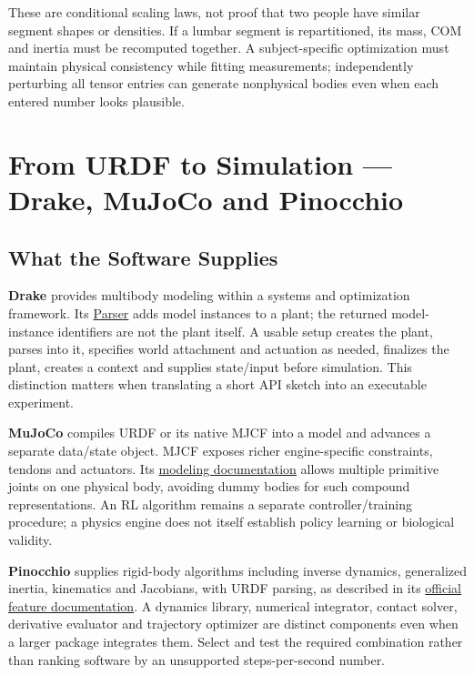 These are conditional scaling laws, not proof that two people have similar segment shapes or densities. If a lumbar segment is repartitioned, its mass, COM and inertia must be recomputed together. A subject-specific optimization must maintain physical consistency while fitting measurements; independently perturbing all tensor entries can generate nonphysical bodies even when each entered number looks plausible.

\section{From URDF to Simulation --- Drake, MuJoCo and Pinocchio}
\label{sec:simulation_engines}

\subsection{What the Software Supplies}

\textbf{Drake} provides multibody modeling within a systems and optimization framework. Its \href{https://drake.mit.edu/pydrake/pydrake.multibody.parsing.html}{Parser} adds model instances to a plant; the returned model-instance identifiers are not the plant itself. A usable setup creates the plant, parses into it, specifies world attachment and actuation as needed, finalizes the plant, creates a context and supplies state/input before simulation. This distinction matters when translating a short API sketch into an executable experiment.

\textbf{MuJoCo} compiles URDF or its native MJCF into a model and advances a separate data/state object. MJCF exposes richer engine-specific constraints, tendons and actuators. Its \href{https://mujoco.readthedocs.io/en/3.4.0/modeling.html}{modeling documentation} allows multiple primitive joints on one physical body, avoiding dummy bodies for such compound representations. An RL algorithm remains a separate controller/training procedure; a physics engine does not itself establish policy learning or biological validity.

\textbf{Pinocchio} supplies rigid-body algorithms including inverse dynamics, generalized inertia, kinematics and Jacobians, with URDF parsing, as described in its \href{https://stack-of-tasks.github.io/pinocchio/}{official feature documentation}. A dynamics library, numerical integrator, contact solver, derivative evaluator and trajectory optimizer are distinct components even when a larger package integrates them. Select and test the required combination rather than ranking software by an unsupported steps-per-second number.


